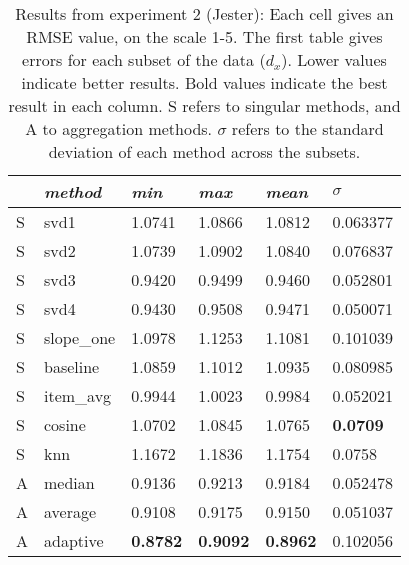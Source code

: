 \begin{table}[p]
  \begin{tabular*}{\textwidth}{ l p{3cm} p{2cm} p{2cm} p{2cm} p{2cm} }
    \toprule
      ~ & \emph{method} & 
      \emph{min} & \emph{max} & \emph{mean} & $\sigma$\\
    \midrule
S & svd1       &  1.0741  &  1.0866  &  1.0812  &  0.063377  \\
S & svd2       &  1.0739  &  1.0902  &  1.0840  &  0.076837  \\
S & svd3       &  0.9420  &  0.9499  &  0.9460  &  0.052801  \\
S & svd4       &  0.9430  &  0.9508  &  0.9471  &  0.050071  \\
S & slope\_one &  1.0978  &  1.1253  &  1.1081  &  0.101039  \\
S & baseline   &  1.0859  &  1.1012  &  1.0935  &  0.080985  \\
S & item\_avg  &  0.9944  &  1.0023  &  0.9984  &  0.052021  \\
S & cosine     &  1.0702  &  1.0845  &  1.0765  &  \textbf{0.0709}    \\
S & knn        &  1.1672  &  1.1836  &  1.1754  &  0.0758    \\
\midrule
A & median   &  0.9136  &  0.9213  &  0.9184  &  0.052478  \\
A & average  &  0.9108  &  0.9175  &  0.9150  &  0.051037  \\
A & adaptive  &  \textbf{0.8782}  &  \textbf{0.9092}  &  \textbf{0.8962}  &  0.102056  \\
    \bottomrule
  \end{tabular*}
  \vspace{2em}

  \caption[Results from Experiment 2]{
    Results from experiment 2 (Jester):
    Each cell gives an RMSE value, on the scale 1-5.
    The first table gives errors for each subset of the data ($d_x$).
    Lower values indicate better results.
    Bold values indicate the best result in each column.
    S refers to singular methods, and A to aggregation methods.
    $\sigma$ refers to the standard deviation of each method across the subsets.
  }
  \label{table:results:e2}
\end{table}

